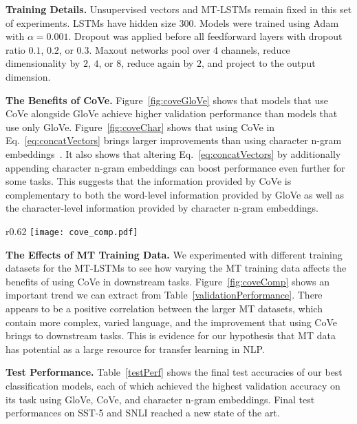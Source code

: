 \documentclass{article}
\begin{document}
\textbf{Training Details.}
Unsupervised vectors and MT-LSTMs remain fixed in this set of experiments.
LSTMs have hidden size 300.
Models were trained using Adam with $\alpha=0.001$. 
Dropout was applied before all feedforward layers with dropout ratio $0.1$, $0.2$, or $0.3$.
Maxout networks pool over $4$ channels, reduce dimensionality by $2$, $4$, or $8$, reduce again by $2$, and project to the output dimension.

\textbf{The Benefits of CoVe.}
Figure~\ref{fig:coveGloVe} shows that models that use CoVe alongside GloVe achieve higher validation performance than models that use only GloVe.
Figure~\ref{fig:coveChar} shows that using CoVe in Eq.~\ref{eq:concatVectors} brings larger improvements than using character n-gram embeddings~\citep{Hashimoto2016AJM}. It also shows that altering Eq.~\ref{eq:concatVectors} by additionally appending character n-gram embeddings can boost performance even further for some tasks.
This suggests that the information provided by CoVe is complementary to both the word-level information provided by GloVe as well as the character-level information provided by character n-gram embeddings.


\begin{wrapfigure}[16]{r}{0.62\textwidth}
\vspace{-5.5mm}
  \centering
  \texttt{[image: cove\_comp.pdf]}
  \caption{The Effects of MT Training Data
  }
\label{fig:coveComp}
\end{wrapfigure}

\textbf{The Effects of MT Training Data.}
We experimented with different training datasets for the MT-LSTMs to see how varying the MT training data affects the benefits of using CoVe in downstream tasks.
Figure~\ref{fig:coveComp} shows an important trend we can extract from Table~\ref{validationPerformance}. 
There appears to be a positive correlation between the larger MT datasets,
which contain more complex, varied language, 
and the improvement that using CoVe brings to downstream tasks.
This is evidence for our hypothesis that MT data has potential as a large resource for transfer learning in NLP.

\textbf{Test Performance.} 
Table~\ref{testPerf} shows the final test accuracies of our best classification models, 
each of which achieved the highest validation accuracy on its task using GloVe, CoVe, and character n-gram embeddings.
Final test performances on SST-5 and SNLI reached a new state of the art.
\end{document}
